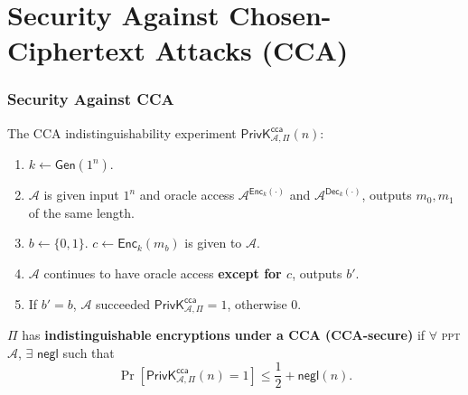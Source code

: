 \section{Security Against Chosen-Ciphertext Attacks (CCA)}
\begin{frame}\frametitle{Security Against CCA}
The CCA indistinguishability experiment $\mathsf{PrivK}^{\mathsf{cca}}_{\mathcal{A},\Pi}(n)$:
\begin{enumerate}
	\item $k \gets \mathsf{Gen}(1^n)$.
	\item $\mathcal{A}$ is given input $1^n$ and oracle access $\mathcal{A}^{\mathsf{Enc}_k(\cdot)}$ and $\mathcal{A}^{\mathsf{Dec}_k(\cdot)}$, outputs $m_0, m_1$ of the same length.
	\item $b \gets \{0,1\}$. $c \gets \mathsf{Enc}_k(m_b)$ is given to $\mathcal{A}$.
	\item $\mathcal{A}$ continues to have oracle access \alert{\textbf{except for $c$}}, outputs $b'$.
	\item If $b' = b$, $\mathcal{A}$ succeeded $\mathsf{PrivK}^{\mathsf{cca}}_{\mathcal{A},\Pi}=1$, otherwise 0.
\end{enumerate}
\begin{definition}
$\Pi$ has \textbf{indistinguishable encryptions under a CCA (CCA-secure)} if $\forall$ \textsc{ppt} $\mathcal{A}$, $\exists$ $\mathsf{negl}$ such that
\[ \Pr\left[\mathsf{PrivK}^{\mathsf{cca}}_{\mathcal{A},\Pi}(n)=1\right] \le \frac{1}{2} + \mathsf{negl}(n).
\]
\end{definition}
\end{frame}
